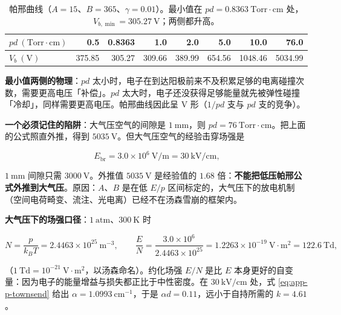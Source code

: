 \begin{table}[htbp]
  \centering
  \small
  \caption{帕邢曲线（$A=15$、$B=365$、$\gamma=0.01$）。最小值在 $pd=0.8363\ \mathrm{Torr\cdot cm}$ 处，$V_{b,\min}=305.27\ \mathrm{V}$；两侧都升高。}
  \label{tab:app-p-paschen}
  \begin{tabular}{@{}lrrrrrrr@{}}
    \toprule
    $pd\ (\mathrm{Torr\cdot cm})$ & 0.5 & 0.8363 & 1.0 & 2.0 & 5.0 & 10.0 & 76.0 \\
    \midrule
    $V_b\ (\mathrm{V})$ & 375.85 & 305.27 & 309.66 & 389.99 & 654.56 & 1048.46 & 5034.99 \\
    \bottomrule
  \end{tabular}
\end{table}

\textbf{最小值两侧的物理}：$pd$ 太小时，电子在到达阳极前来不及积累足够的电离碰撞次数，需要更高电压「补偿」。$pd$ 太大时，电子还没获得足够能量就先被弹性碰撞「冷却」，同样需要更高电压。帕邢曲线因此呈 V 形（$1/pd$ 支与 $pd$ 支的竞争）。

\textbf{一个必须记住的陷阱}：大气压空气的间隙是 $1\ \mathrm{mm}$，则 $pd = 76\ \mathrm{Torr\cdot cm}$。把上面的公式照直外推，得到 $5035\ \mathrm{V}$。但大气压空气的经验击穿场强是

\begin{equation}
  E_{\mathrm{br}} = 3.0\times10^{6}\ \mathrm{V/m} = 30\ \mathrm{kV/cm},
  \label{eq:app-p-empirical}
\end{equation}

$1\ \mathrm{mm}$ 间隙只需 $3000\ \mathrm{V}$。外推值 $5035\ \mathrm{V}$ 是经验值的 $1.68$ 倍：\textbf{不能把低压帕邢公式外推到大气压}。原因：$A$、$B$ 是在低 $E/p$ 区间标定的，大气压下的放电机制（空间电荷畸变、流注、光电离）已经不在汤森雪崩的框架内。

\textbf{大气压下的场强口径}：$1\ \mathrm{atm}$、$300\ \mathrm{K}$ 时

\begin{equation}
  N = \frac{p}{k_BT} = 2.4463\times10^{25}\ \mathrm{m}^{-3},
  \qquad
  \frac{E}{N} = \frac{3.0\times10^{6}}{2.4463\times10^{25}} = 1.2263\times10^{-19}\ \mathrm{V\cdot m^2} = 122.6\ \mathrm{Td},
  \label{eq:app-p-reducedfield}
\end{equation}

（$1\ \mathrm{Td} = 10^{-21}\ \mathrm{V\cdot m^2}$，以汤森命名）。约化场强 $E/N$ 是比 $E$ 本身更好的自变量：因为电子的能量增益与损失都正比于中性密度。在 $30\ \mathrm{kV/cm}$ 处，式 \eqref{eq:app-p-townsend} 给出 $\alpha = 1.0993\ \mathrm{cm^{-1}}$，于是 $\alpha d = 0.11$，远小于自持所需的 $k = 4.61$。

